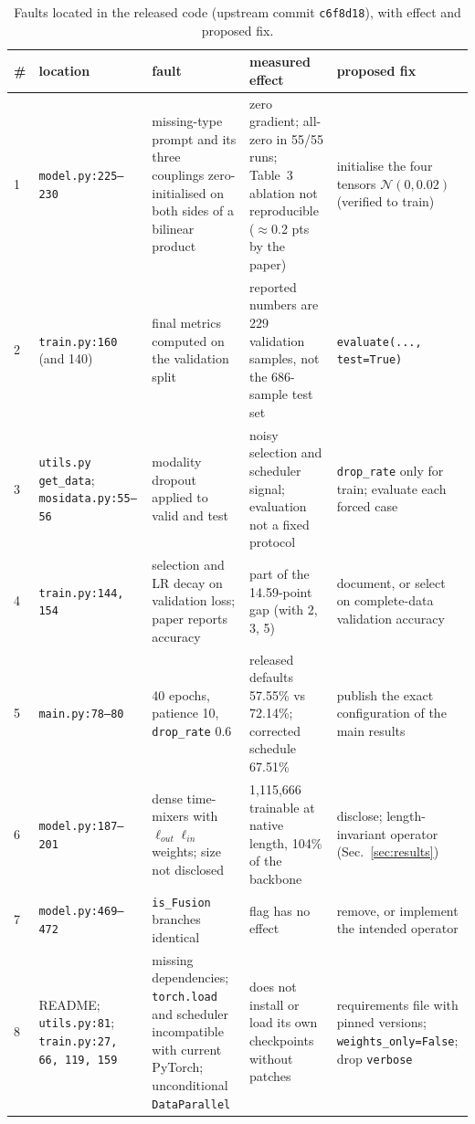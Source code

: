 \documentclass[lettersize,journal]{IEEEtran}
\begin{document}
\begin{table}[!t]
\caption{Faults located in the released code (upstream commit \texttt{c6f8d18}), with effect and proposed fix.\label{tab:faults}}
\centering
\footnotesize
\begin{tabular}{p{0.3cm}p{3.0cm}p{4.6cm}p{4.4cm}p{3.9cm}}
\toprule
\# & location & fault & measured effect & proposed fix\\
\midrule
1 & \texttt{model.py:225--230} & missing-type prompt and its three couplings zero-initialised on both sides of a bilinear product & zero gradient; all-zero in 55/55 runs; Table~3 ablation not reproducible ($\approx$0.2 pts by the paper) & initialise the four tensors $\mathcal{N}(0,0.02)$ (verified to train)\\
2 & \texttt{train.py:160} (and 140) & final metrics computed on the validation split & reported numbers are 229 validation samples, not the 686-sample test set & \texttt{evaluate(..., test=True)}\\
3 & \texttt{utils.py} \texttt{get\_data}; \texttt{mosidata.py:55--56} & modality dropout applied to valid and test & noisy selection and scheduler signal; evaluation not a fixed protocol & \texttt{drop\_rate} only for train; evaluate each forced case\\
4 & \texttt{train.py:144, 154} & selection and LR decay on validation loss; paper reports accuracy & part of the 14.59-point gap (with 2, 3, 5) & document, or select on complete-data validation accuracy\\
5 & \texttt{main.py:78--80} & 40 epochs, patience 10, \texttt{drop\_rate} 0.6 & released defaults 57.55\% vs 72.14\%; corrected schedule 67.51\% & publish the exact configuration of the main results\\
6 & \texttt{model.py:187--201} & dense time-mixers with $\ell_{out}\ell_{in}$ weights; size not disclosed & 1,115,666 trainable at native length, 104\% of the backbone & disclose; length-invariant operator (Sec.~\ref{sec:results})\\
7 & \texttt{model.py:469--472} & \texttt{is\_Fusion} branches identical & flag has no effect & remove, or implement the intended operator\\
8 & README; \texttt{utils.py:81}; \texttt{train.py:27, 66, 119, 159} & missing dependencies; \texttt{torch.load} and scheduler incompatible with current PyTorch; unconditional \texttt{DataParallel} & does not install or load its own checkpoints without patches & requirements file with pinned versions; \texttt{weights\_only=False}; drop \texttt{verbose}\\
\bottomrule
\end{tabular}
\end{table}
\end{document}
